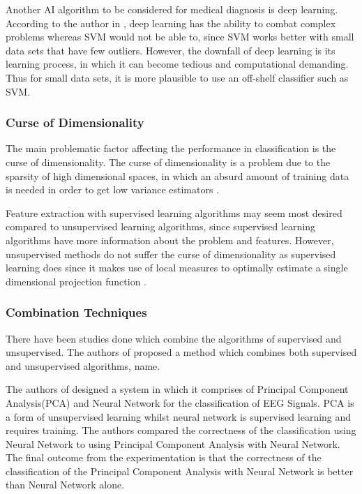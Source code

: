 \documentclass[11pt,twocolumn]{witseiepaper}
\begin{document}
	Another AI algorithm to be considered for medical diagnosis is deep learning. According to the author in \cite{LeCun2015}, deep learning has the ability to combat complex problems whereas SVM would not be able to, since SVM works better with small data sets that have few outliers. However, the downfall of deep learning is its learning process, in which it can become tedious and computational demanding. Thus for small data sets, it is more plausible to use an off-shelf classifier such as SVM. 
	
	\subsubsection{\textbf{Curse of Dimensionality}}
	The main problematic factor affecting the performance in classification is the curse of dimensionality. The curse of dimensionality is a problem due to the sparsity of high dimensional spaces, in which an absurd amount of training data is needed in order to get low variance  estimators \cite{intrator_feature_1992}.
	
	Feature extraction with supervised learning algorithms may seem most desired compared to unsupervised learning algorithms, since supervised learning algorithms have more information about the problem and features. However, unsupervised methods do not suffer the curse of dimensionality as supervised learning does since it makes use of local measures to optimally estimate a single dimensional projection function \cite{intrator_feature_1992}.
	
	\subsubsection{\textbf{Combination Techniques}}
	There have been studies done which combine the algorithms of supervised and unsupervised. The authors of \cite{neagoe_new_2014} proposed a method which combines both supervised and unsupervised algorithms, name.
	
	The authors of \cite{kottaimalai_eeg_2013} designed a system in which it comprises of Principal Component Analysis(PCA) and Neural Network for the classification of EEG Signals. PCA is a form of unsupervised learning whilst neural network is supervised learning and requires training. The authors compared the correctness of the classification using Neural Network to using Principal Component Analysis with Neural Network. The final outcome from the experimentation is that the correctness of the classification of the Principal Component Analysis with Neural Network is better than Neural Network alone. 
	
\end{document}
